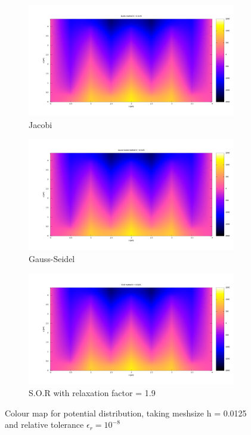 \begin{figure}[h]
    \centering
    \begin{subfigure}{.5\textwidth}
      \centering
      \includegraphics[width=.9\linewidth]{content/graphs/Jacobi_0125_map.png}
      \caption{Jacobi}
      \label{fig:sub1}
    \end{subfigure}%
    \begin{subfigure}{.5\textwidth}
      \centering
      \includegraphics[width=.9\linewidth]{content/graphs/Gauss_0125_map.png}
      \caption{Gauss-Seidel}
      \label{fig:sub2}
    \end{subfigure}
    \begin{subfigure}{.5\textwidth}
        \centering
        \includegraphics[width=.9\linewidth]{content/graphs/SOR_0125_map.png}
        \caption{S.O.R with relaxation factor = 1.9}
        \label{fig:sub3}
    \end{subfigure}
    \caption{ \centering Colour map for potential distribution, taking meshsize h = 0.0125 and relative tolerance $\epsilon_r = 10^{-8}$}
    \label{fig:}
\end{figure}

